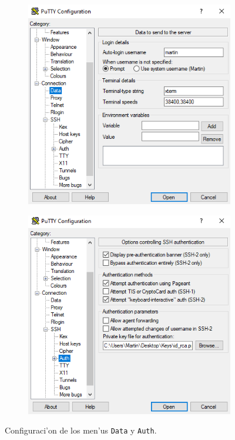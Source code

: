 \documentclass[11pt]{article}
\begin{document}
		\begin{figure}[H]
			\centering
			\begin{subfigure}[b]{0.45\linewidth}
				\includegraphics[scale=0.48]{Images/Connection/putty_data.PNG}
			\end{subfigure}
			\begin{subfigure}[b]{0.45\linewidth}
				\includegraphics[scale=0.48]{Images/Connection/putty_SSH.PNG}
			\end{subfigure}
			\caption{Configuraci'on de los men'us \texttt{Data} y \texttt{Auth}.}
			\label{fig:putty_configs}
		\end{figure}
		
\end{document}
